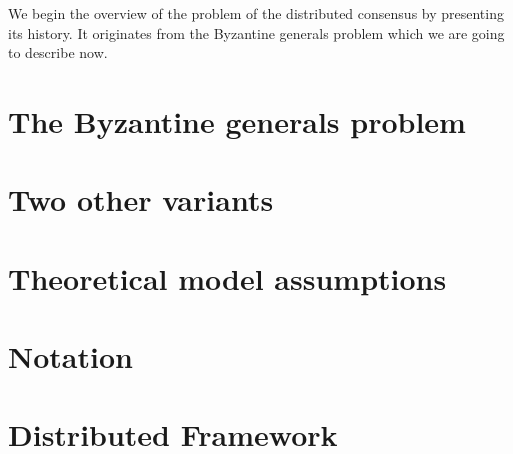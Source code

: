 We begin the overview of the problem of the distributed consensus by presenting its history. It originates from the Byzantine generals problem which we are going to describe now.

\section{The Byzantine generals problem}


\section{Two other variants}


\section{Theoretical model assumptions}


\section{Notation}


\section{Distributed Framework}
